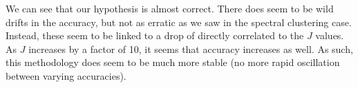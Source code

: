 \documentclass[11pt]{amsart}
\begin{document}
We can see that our hypothesis is almost correct. There does seem to be wild drifts in the accuracy, 
but not as erratic as we saw in the spectral clustering case. Instead, these seem to be linked to a drop of directly 
correlated to the $J$ values. As $J$ increases by a factor of 10, it seems that accuracy increases as well. As such, this 
methodology does seem to be much more stable (no more rapid oscillation between varying accuracies). 






\end{document}
